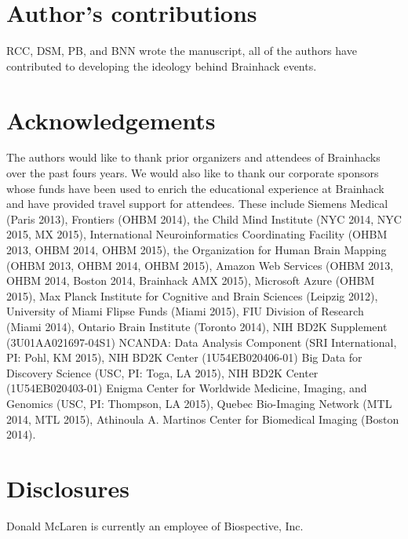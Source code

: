 \documentclass[11pt]{bmc_article_s50}
\begin{document}
\section*{Author's contributions}
RCC, DSM, PB, and BNN wrote the manuscript, all of the authors have contributed to developing the ideology behind Brainhack events.

\section*{Acknowledgements}
The authors would like to thank prior organizers and attendees of Brainhacks over the past fours years. We would also like to thank our corporate sponsors whose funds have been used to enrich the educational experience at Brainhack and have provided travel support for attendees. These include Siemens Medical (Paris 2013), Frontiers (OHBM 2014), the Child Mind Institute (NYC 2014, NYC 2015, MX 2015), International Neuroinformatics Coordinating Facility (OHBM 2013, OHBM 2014, OHBM 2015), the Organization for Human Brain Mapping (OHBM 2013, OHBM 2014, OHBM 2015), Amazon Web Services (OHBM 2013, OHBM 2014, Boston 2014, Brainhack AMX 2015), Microsoft Azure (OHBM 2015), Max Planck Institute for Cognitive and Brain Sciences (Leipzig 2012), University of Miami Flipse Funds (Miami 2015), FIU Division of Research (Miami 2014), Ontario Brain Institute (Toronto 2014), NIH BD2K Supplement (3U01AA021697-04S1) NCANDA: Data Analysis Component (SRI International, PI: Pohl, KM 2015), NIH BD2K Center (1U54EB020406-01) Big Data for Discovery Science (USC, PI: Toga, LA 2015),
NIH BD2K Center (1U54EB020403-01) Enigma Center for Worldwide Medicine, Imaging, and Genomics (USC, PI: Thompson, LA 2015), Quebec Bio-Imaging Network (MTL 2014, MTL 2015), Athinoula A. Martinos Center for Biomedical Imaging (Boston 2014).

\section*{Disclosures}

Donald McLaren is currently an employee of Biospective, Inc.






 
 
\end{document}
